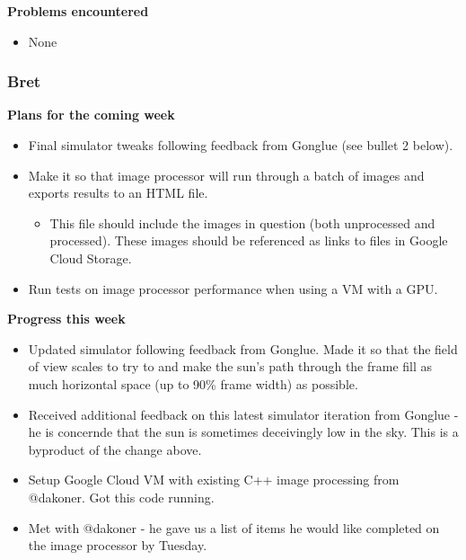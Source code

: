 \documentclass[10pt, onecolumn, draftclsnofoot, letterpaper, compsoc]{IEEEtran}
\begin{document}
    \noindent \textbf{Problems encountered}

    \begin{itemize}

    \item None

    \end{itemize}

    \subsubsection{Bret}

    \noindent \textbf{Plans for the coming week}

    \begin{itemize}

    \item Final simulator tweaks following feedback from Gonglue (see bullet 2 below).
    \item Make it so that image processor will run through a batch of images and exports results to an HTML file.

    \begin{itemize}
      \item This file should include the images in question (both unprocessed and processed). These images should
        be referenced as links to files in Google Cloud Storage.
    \end{itemize}

    \item Run tests on image processor performance when using a VM with a GPU.

    \end{itemize}

    \noindent \textbf{Progress this week}

    \begin{itemize}

    \item Updated simulator following feedback from Gonglue. Made it so that the field of view scales to try to and make
      the sun's path through the frame fill as much horizontal space (up to 90\% frame width) as possible.
    \item Received additional feedback on this latest simulator iteration from Gonglue - he is concernde that the sun
      is sometimes deceivingly low in the sky. This is a byproduct of the change above.
    \item Setup Google Cloud VM with existing C++ image processing from @dakoner. Got this code running.
    \item Met with @dakoner - he gave us a list of items he would like completed on the image processor by Tuesday.

    \end{itemize}
\end{document}
